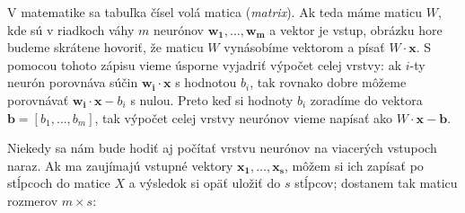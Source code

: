 V matematike sa tabuľka čísel volá matica ({\em matrix}). Ak teda máme maticu $W$, kde sú v riadkoch
váhy $m$ neurónov $\bm{w_1},\ldots,\bm{w_m}$ a vektor  je vstup, obrázku
hore budeme skrátene 
hovoriť, že maticu $W$ vynásobíme vektorom  a písať $W\cdot\bm{x}$. 
S pomocou tohoto zápisu vieme úsporne vyjadriť výpočet celej vrstvy: 
ak $i$-ty neurón porovnáva súčin $\bm{w_i}\cdot\bm{x}$ s hodnotou $b_i$,
tak rovnako dobre môžeme porovnávať $\bm{w_i}\cdot\bm{x}-b_i$ s nulou.
Preto keď si hodnoty $b_i$ zoradíme do vektora $\bm{b}=[b_1,\ldots,b_m]$,
tak výpočet celej vrstvy neurónov vieme napísať ako $W\cdot\bm{x}-\bm{b}$.

Niekedy sa nám bude hodiť aj počítať vrstvu neurónov na viacerých vstupoch naraz.
Ak ma zaujímajú vstupné vektory $\bm{x_1},\ldots,\bm{x_s}$, môžem si ich
zapísať po stĺpcoch do matice $X$ a výsledok si opäť uložiť do $s$ stĺpcov;
dostanem tak maticu rozmerov $m\times s$:

\def\bmatr(#1){\begin{scope}[xscale=1.1, yscale=0.7, shift={(#1)}]}
\def\ematr{\end{scope}}


